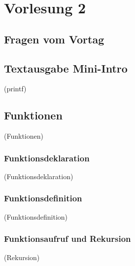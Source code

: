 \section{Vorlesung 2}

\setcounter{minutecounter}{0}

\subsection{Fragen vom Vortag}
\iflecturer
\begin{framed}
\end{framed}
\fi

\subsection{Textausgabe Mini-Intro}
\iflecturer
\begin{framed}
  
  \slide{} (printf)
\end{framed}
\fi

\subsection{Funktionen}
\iflecturer
\begin{framed}
  \slide{} (Funktionen)
\end{framed}
\fi

\subsubsection{Funktionsdeklaration}
\iflecturer
\begin{framed}
  \slide{} (Funktionsdeklaration)
\end{framed}
\fi

\subsubsection{Funktionsdefinition}
\iflecturer
\begin{framed}
  \slide{} (Funktionsdefinition)
\end{framed}
\fi

\subsubsection{Funktionsaufruf und Rekursion}
\iflecturer
\begin{framed}
  \slide{} (Rekursion)
\end{framed}
\fi

